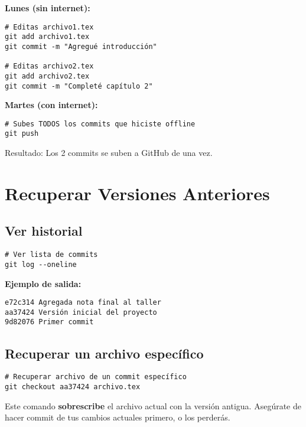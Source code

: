 \documentclass[11pt,a4paper]{article}
\begin{document}
\begin{infobox}
\textbf{Lunes (sin internet):}
\begin{lstlisting}[style=bashstyle]
# Editas archivo1.tex
git add archivo1.tex
git commit -m "Agregué introducción"

# Editas archivo2.tex
git add archivo2.tex
git commit -m "Completé capítulo 2"
\end{lstlisting}

\textbf{Martes (con internet):}
\begin{lstlisting}[style=bashstyle]
# Subes TODOS los commits que hiciste offline
git push
\end{lstlisting}

Resultado: Los 2 commits se suben a GitHub de una vez.
\end{infobox}

\section{Recuperar Versiones Anteriores}

\subsection{Ver historial}

\begin{lstlisting}[style=bashstyle]
# Ver lista de commits
git log --oneline
\end{lstlisting}

\textbf{Ejemplo de salida:}
\begin{lstlisting}[style=bashstyle]
e72c314 Agregada nota final al taller
aa37424 Versión inicial del proyecto
9d82076 Primer commit
\end{lstlisting}

\subsection{Recuperar un archivo específico}

\begin{lstlisting}[style=bashstyle]
# Recuperar archivo de un commit específico
git checkout aa37424 archivo.tex
\end{lstlisting}

\begin{warningbox}[¡Atención!]
Este comando \textbf{sobrescribe} el archivo actual con la versión antigua. Asegúrate de hacer commit de tus cambios actuales primero, o los perderás.
\end{warningbox}
\end{document}
